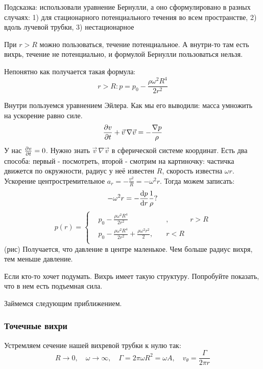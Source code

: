 Подсказка: использовали уравнение Бернулли, а оно сформулировано в разных случаях: 1) для стационарного потенциального течения во всем пространстве, 2) вдоль лучевой трубки, 3) нестационарное

При $r>R$ можно пользоваться, течение потенциальное. А внутри-то там есть вихрь, течение не потенциально, и формулой Бернулли пользоваться нельзя.

Непонятно как получается такая формула:
\begin{equation}
	r>R: p=p_0-\frac{\rho\omega^2 R^4}{2r^2}
\end{equation}

Внутри пользуемся уравнением Эйлера. Как мы его выводили: масса умножить на ускорение равно силе.
\begin{equation}
	\pdv{v}{t}+\vec{v}\,\nabla\vec{v}=-\frac{\nabla p}{\rho}
\end{equation}
У нас $\pdv{v}{t}=0$. Нужно знать $\vec{v}\,\nabla\vec{v}$ в сферической системе координат. Есть два способа: первый - посмотреть, второй - смотрим на картиночку: частичка движется по окружности, радиус у неё известен $R$, скорость известна $\omega r$. Ускорение центростремительное $a_r=-\frac{v^2}{R}=-\omega^2 r$. Тогда можем записать:
\begin{equation}
	-\omega^2 r  = - \dv{p}{r}\frac{1}{\rho}?
\end{equation}
\begin{equation}
	p(r)=\left\{
	\begin{aligned}
		&p_0-\frac{\rho\omega^2 R^4}{2r^2}&, \quad& r>R\\
		&p_0-\frac{\rho\omega^2 R^4}{2r^2}+\frac{\rho\omega^2 r^2}{2}, \quad& r<R\\
	\end{aligned}
	\right.
\end{equation}
(рис)
Получается, что давление в центре маленькое. Чем больше радиус вихря, тем меньше давление.


Если кто-то хочет подумать. Вихрь имеет такую \/ структуру. Попробуйте показать, что в нем есть подъемная сила.


Займемся следующим приближением.
\subsubsection{Точечные вихри}

Устремляем сечение нашей вихревой трубки к нулю так:
\begin{equation}
	R\to0, \quad \omega\to\infty, \quad \Gamma=2\pi \omega R^2 =\omega A, \quad v_\theta=\frac{\Gamma}{2\pi r}
\end{equation}

